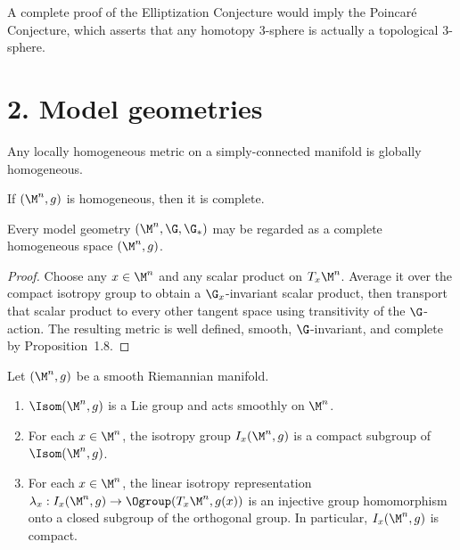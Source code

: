 \begin{remark}
\label{ch01-rem-poincare}
A complete proof of the Elliptization Conjecture would imply the Poincar\'e Conjecture, which asserts that any homotopy $3$-sphere is actually a topological $3$-sphere.
\end{remark}

\section*{2. Model geometries}

\begin{proposition}
\label{ch01-prop-singer}
Any locally homogeneous metric on a simply-connected manifold is globally homogeneous.
\end{proposition}

\begin{proposition}
\label{ch01-prop-homogeneous-complete}
If $(\M^n,g)$ is homogeneous, then it is complete.
\end{proposition}

\begin{lemma}
\label{ch01-lem-model-geometry-to-homogeneous-space}
Every model geometry $(\M^n,\G,\G_*)$ may be regarded as a complete homogeneous space $(\M^n,g)$.
\end{lemma}

\begin{proof}
\sketch Choose any $x\in \M^n$ and any scalar product on $T_x\M^n$. Average it over the compact isotropy group to obtain a $\G_x$-invariant scalar product, then transport that scalar product to every other tangent space using transitivity of the $\G$-action. The resulting metric is well defined, smooth, $\G$-invariant, and complete by Proposition~1.8.
\end{proof}

\begin{proposition}
\label{ch01-prop-isometry-group}
Let $(\M^n,g)$ be a smooth Riemannian manifold.
\begin{enumerate}
\item $\Isom(\M^n,g)$ is a Lie group and acts smoothly on $\M^n$.
\item For each $x \in \M^n$, the isotropy group $I_x(\M^n,g)$ is a compact subgroup of $\Isom(\M^n,g)$.
\item For each $x \in \M^n$, the linear isotropy representation $\lambda_x : I_x(\M^n,g) \to \Ogroup(T_x \M^n, g(x))$ is an injective group homomorphism onto a closed subgroup of the orthogonal group. In particular, $I_x(\M^n,g)$ is compact.
\end{enumerate}
\end{proposition}

